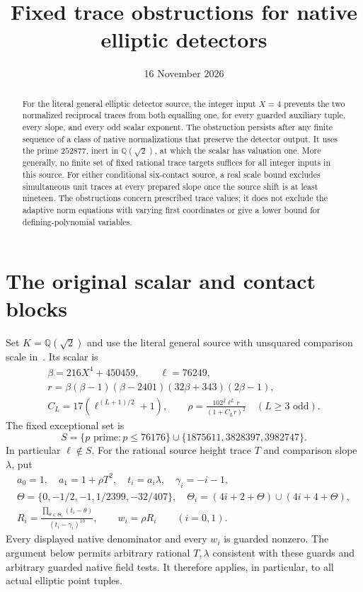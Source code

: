 \documentclass[11pt,a4paper]{article}
\title{Fixed trace obstructions for native elliptic detectors}
\author{}\date{16 November 2026}
\newcommand{\Q}{\mathbb Q}\newcommand{\Z}{\mathbb Z}
\begin{document}
\maketitle
\begin{abstract}
For the literal general elliptic detector source, the integer input
$X=4$ prevents the two normalized reciprocal traces from both equalling
one, for every guarded auxiliary tuple, every slope, and every odd
scalar exponent. The obstruction persists after any finite sequence
of a class of native normalizations that preserve the detector output.
It uses the prime $252877$, inert in $\Q(\sqrt2)$, at which the scalar
has valuation one. More generally, no finite set of fixed rational
trace targets suffices for all integer inputs in this source.
For either conditional six-contact source, a real scale bound excludes simultaneous unit traces at every prepared slope once the source shift is at least nineteen.
The obstructions concern prescribed trace values; it does not exclude
the adaptive norm equations with varying first coordinates or give a
lower bound for defining-polynomial variables.
\end{abstract}

\section{The original scalar and contact blocks}

Set $K=\Q(\sqrt2)$ and use the literal general source with unsquared
comparison scale in~\cite{Unit}. Its scalar is
\begin{equation}\label{eq:scalar}
\begin{gathered}
 \beta=216X^4+450459,\qquad \ell=76249,\\
 r=\beta(\beta-1)(\beta-2401)(32\beta+343)(2\beta-1),\\
 C_L=17(\ell^{(L+1)/2}+1),\qquad
 \rho=\frac{102^2\ell^Lr}{(1+C_Lr)^2}\quad(L\ge3\text{ odd}).
\end{gathered}
\end{equation}
The fixed exceptional set is
\[
 S=\{p\text{ prime}:p\le76176\}
                  \cup\{1875611,3828397,3982747\}.
\]
In particular $\ell\notin S$. For the rational source height trace $T$
and comparison slope $\lambda$, put
\begin{equation}\label{eq:weights}
\begin{gathered}
 a_0=1,\quad a_1=1+\rho T^2,\quad t_i=a_i\lambda,\quad
 \gamma_i=-i-1,\\
 \Theta=\{0,-1/2,-1,1/2399,-32/407\},\quad
 \Theta_i=(4i+2+\Theta)\cup(4i+4+\Theta),\\
 R_i=\frac{\prod_{\theta\in\Theta_i}(t_i-\theta)}
                  {(t_i-\gamma_i)^{10}},\qquad w_i=\rho R_i
                  \qquad(i=0,1).
\end{gathered}
\end{equation}
Every displayed native denominator and every $w_i$ is guarded nonzero.
The argument below permits arbitrary rational $T,\lambda$ consistent
with these guards and arbitrary guarded native field tests. It
therefore applies, in particular, to all actual elliptic point tuples.
\end{document}
